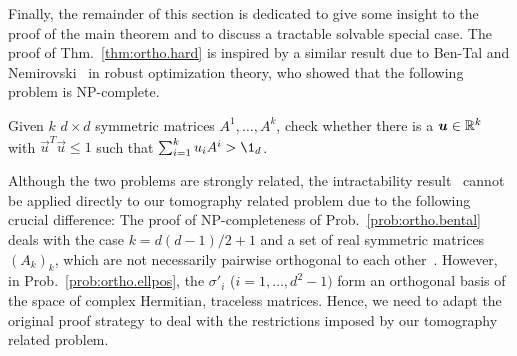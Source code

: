 Finally, the remainder of this section is dedicated to give some insight to the proof of the main theorem and to discuss a tractable solvable special case.
The proof of Thm.~\ref{thm:ortho.hard} is inspired by a similar result due to Ben-Tal and Nemirovski~\cite{Tal_1998_Robust} in robust optimization theory, who showed that the following problem is NP-complete.
\begin{problem}\label{prob:ortho.bental}
  Given $k$ $d\times d$ symmetric matrices $A^{1},\ldots,A^{k}$, check whether there is a $\boldsymbol{u} \in \mathbb{R}^k$ with $\vec{u}^{T}\vec{u} \leq 1$ such that $\sum_{i=1}^{k}u_{i}A^{i} > \1_{d}$.
\end{problem}
Although the two problems are strongly related, the intractability result~\cite{Tal_1998_Robust} cannot be applied directly to our tomography related problem due to the following crucial difference:
The proof of NP-completeness of Prob.~\ref{prob:ortho.bental} deals with the case $k=d(d-1)/2+1$ and a set of real symmetric matrices ${(A_k)}_k$, which are not necessarily pairwise orthogonal to each other~\cite[Sec.~3.4.1]{Tal_1998_Robust}.
However, in Prob.~\ref{prob:ortho.ellpos}, the $\sigma'_i$ ($i=1,\ldots,d^2 - 1)$ form an orthogonal basis of the space of complex Hermitian, traceless matrices.
Hence, we need to adapt the original proof strategy to deal with the restrictions imposed by our tomography related problem.


